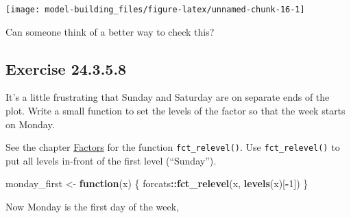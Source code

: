 \documentclass[]{book}
\newenvironment{Shaded}{\begin{snugshade}}{\end{snugshade}}
\newcommand{\ControlFlowTok}[1]{\textcolor[rgb]{0.13,0.29,0.53}{\textbf{#1}}}
\newcommand{\DataTypeTok}[1]{\textcolor[rgb]{0.13,0.29,0.53}{#1}}
\newcommand{\DecValTok}[1]{\textcolor[rgb]{0.00,0.00,0.81}{#1}}
\newcommand{\KeywordTok}[1]{\textcolor[rgb]{0.13,0.29,0.53}{\textbf{#1}}}
\newcommand{\NormalTok}[1]{#1}
\newcommand{\OperatorTok}[1]{\textcolor[rgb]{0.81,0.36,0.00}{\textbf{#1}}}
\newcommand{\OtherTok}[1]{\textcolor[rgb]{0.56,0.35,0.01}{#1}}
\newcommand{\StringTok}[1]{\textcolor[rgb]{0.31,0.60,0.02}{#1}}
\theoremstyle{plain}
\theoremstyle{remark}
\begin{document}
\begin{center}\texttt{[image: model-building\_files/figure-latex/unnamed-chunk-16-1]} \end{center}

Can someone think of a better way to check this?

\hypertarget{exercise-24.3.5.8}{%
\subsection*{\texorpdfstring{Exercise
{24.3.5.8}}{Exercise 24.3.5.8}}\label{exercise-24.3.5.8}}

It's a little frustrating that Sunday and Saturday are on separate ends
of the plot. Write a small function to set the levels of the factor so
that the week starts on Monday.

See the chapter \href{http://r4ds.had.co.nz/factors.html}{Factors} for
the function \texttt{fct\_relevel()}. Use \texttt{fct\_relevel()} to put
all levels in-front of the first level (``Sunday'').

\begin{Shaded}
\begin{Highlighting}[]
\NormalTok{monday_first <-}\StringTok{ }\ControlFlowTok{function}\NormalTok{(x) \{}
\NormalTok{  forcats}\OperatorTok{::}\KeywordTok{fct_relevel}\NormalTok{(x, }\KeywordTok{levels}\NormalTok{(x)[}\OperatorTok{-}\DecValTok{1}\NormalTok{])  }
\NormalTok{\}}
\end{Highlighting}
\end{Shaded}

Now Monday is the first day of the week,

\begin{Shaded}
\end{Shaded}
\end{document}
